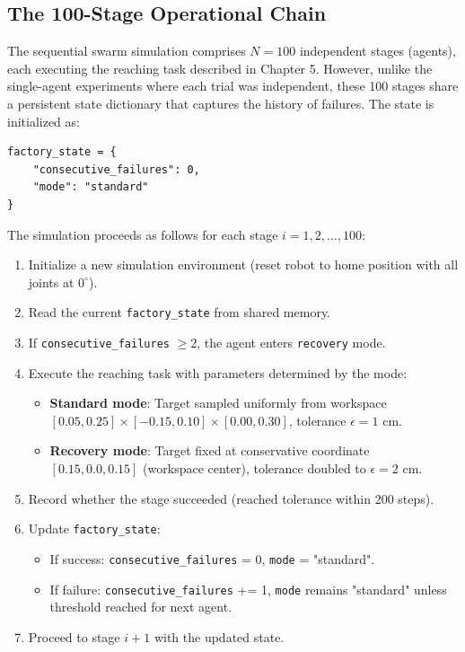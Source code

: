 ﻿\documentclass[12pt,a4paper,oneside]{report}
\begin{document}
\subsection{The 100-Stage Operational Chain}

The sequential swarm simulation comprises $N = 100$ independent stages (agents), each executing the reaching task described in Chapter 5. However, unlike the single-agent experiments where each trial was independent, these 100 stages share a persistent state dictionary that captures the history of failures. The state is initialized as:

\begin{verbatim}
factory_state = {
    "consecutive_failures": 0,
    "mode": "standard"
}
\end{verbatim}

The simulation proceeds as follows for each stage $i = 1, 2, \ldots, 100$:

\begin{enumerate}
    \item Initialize a new simulation environment (reset robot to home position with all joints at $0^\circ$).
    \item Read the current \texttt{factory\_state} from shared memory.
    \item If \texttt{consecutive\_failures} $\geq 2$, the agent enters \texttt{recovery} mode.
    \item Execute the reaching task with parameters determined by the mode:
        \begin{itemize}
            \item \textbf{Standard mode}: Target sampled uniformly from workspace $[0.05, 0.25] \times [-0.15, 0.10] \times [0.00, 0.30]$, tolerance $\epsilon = 1$ cm.
            \item \textbf{Recovery mode}: Target fixed at conservative coordinate $[0.15, 0.0, 0.15]$ (workspace center), tolerance doubled to $\epsilon = 2$ cm.
        \end{itemize}
    \item Record whether the stage succeeded (reached tolerance within 200 steps).
    \item Update \texttt{factory\_state}:
        \begin{itemize}
            \item If success: \texttt{consecutive\_failures} = 0, \texttt{mode} = "standard".
            \item If failure: \texttt{consecutive\_failures} += 1, \texttt{mode} remains "standard" unless threshold reached for next agent.
        \end{itemize}
    \item Proceed to stage $i+1$ with the updated state.
\end{enumerate}
\end{document}
